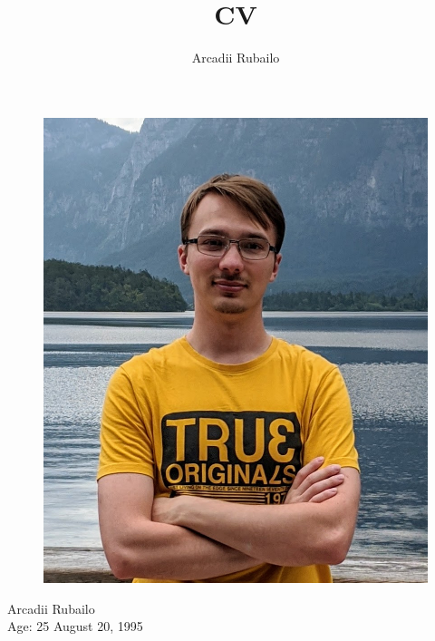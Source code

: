 \documentclass[12pt, a4paper]{article}
\title{CV}
\author{Arcadii Rubailo}
\begin{document}
\begin{minipage}[t]{0.3\textwidth}

    \begin{figure}[H]
        \includegraphics[width=\textwidth]{profile}
    \end{figure}
    
    Arcadii Rubailo \\
    Age: 25 August 20, 1995
    
    \hfill
    

\end{minipage}
\end{document}
